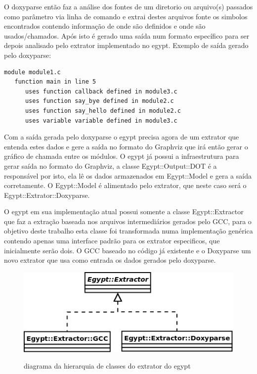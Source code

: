 O doxyparse então faz a análise dos fontes de um diretorio ou arquivo(s)
passados como parâmetro via linha de comando e extrai destes arquivos fonte os
simbolos encontrados contendo informação de onde são definidos e onde são
usados/chamados. Após isto é gerado uma saída num formato específico para ser
depois analisado pelo extrator implementado no egypt. Exemplo de saída gerado
pelo doxyparse:

\begin{verbatim}
module module1.c
   function main in line 5
      uses function callback defined in module3.c
      uses function say_bye defined in module2.c
      uses function say_hello defined in module2.c
      uses variable variable defined in module3.c
\end{verbatim}

Com a saída gerada pelo doxyparse o egypt precisa agora de um extrator que
entenda estes dados e gere a saída no formato do Graphviz que irá então gerar o
gráfico de chamada entre os módulos. O egypt já possui a infraestrutura
para gerar saída no formato do Graphviz, a classe Egypt::Output::DOT é a
responsável por isto, ela lê os dados armazenados em Egypt::Model e gera a
saída corretamente. O Egypt::Model é alimentado pelo extrator, que neste caso será
o Egypt::Extrator::Doxyparse.

O egypt em sua implementação atual possui somente a classe Egypt::Extractor que
faz a extração baseada nos arquivos intermediários gerados pelo GCC, para o
objetivo deste trabalho esta classe foi transformada numa implementação
genérica contendo apenas uma interface padrão para os extrator especificos, que
inicialmente serão dois. O GCC baseado no código já existente e o Doxyparse um
novo extrator que usa como entrada os dados gerados pelo doxyparse.

\begin{figure}[h]
\center
\includegraphics[scale=0.5]{imagens/egypt-diagram-extractor}
\label{egypt-diagram-extractor}
\caption{diagrama da hierarquia de classes do extrator do egypt}
\end{figure}

